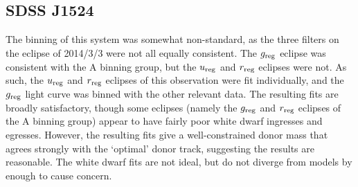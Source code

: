 \newpage
\subsection{SDSS J1524}

The binning of this system was somewhat non-standard, as the three filters on the eclipse of 2014/3/3 were not all equally consistent. The $g_{\rm reg}$ eclipse was consistent with the A binning group, but the $u_{\rm reg}$ and $r_{\rm reg}$ eclipses were not.
As such, the $u_{\rm reg}$ and $r_{\rm reg}$ eclipses of this observation were fit individually, and the $g_{\rm reg}$ light curve was binned with the other relevant data.
The resulting fits are broadly satisfactory, though some eclipses (namely the $g_{\rm reg}$ and $r_{\rm reg}$ eclipses of the A binning group) appear to have fairly poor white dwarf ingresses and egresses.
However, the resulting fits give a well-constrained donor mass that agrees strongly with the `optimal' \citet{knigge11} donor track, suggesting the results are reasonable. The white dwarf fits are not ideal, but do not diverge from models by enough to cause concern.




%     

